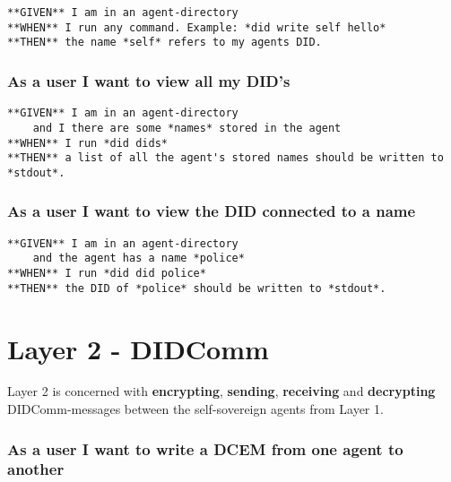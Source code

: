 \begin{lstlisting}
**GIVEN** I am in an agent-directory
**WHEN** I run any command. Example: *did write self hello*
**THEN** the name *self* refers to my agents DID.
\end{lstlisting}

\hypertarget{as-a-user-i-want-to-view-all-my-dids}{%
\subsubsection{As a user I want to view all my
DID's}\label{as-a-user-i-want-to-view-all-my-dids}}

\begin{lstlisting}
**GIVEN** I am in an agent-directory
    and I there are some *names* stored in the agent
**WHEN** I run *did dids*
**THEN** a list of all the agent's stored names should be written to *stdout*.
\end{lstlisting}

\hypertarget{as-a-user-i-want-to-view-the-did-connected-to-a-name}{%
\subsubsection{As a user I want to view the DID connected to a
name}\label{as-a-user-i-want-to-view-the-did-connected-to-a-name}}

\begin{lstlisting}
**GIVEN** I am in an agent-directory
    and the agent has a name *police*
**WHEN** I run *did did police*
**THEN** the DID of *police* should be written to *stdout*.
\end{lstlisting}

\hypertarget{layer-2---didcomm}{%
\section{Layer 2 - DIDComm}\label{layer-2---didcomm}}

Layer 2 is concerned with \textbf{encrypting}, \textbf{sending},
\textbf{receiving} and \textbf{decrypting} DIDComm-messages between the
self-sovereign agents from Layer 1.

\hypertarget{as-a-user-i-want-to-write-a-dcem-from-one-agent-to-another}{%
\subsubsection{As a user I want to write a DCEM from one agent to
another}\label{as-a-user-i-want-to-write-a-dcem-from-one-agent-to-another}}

